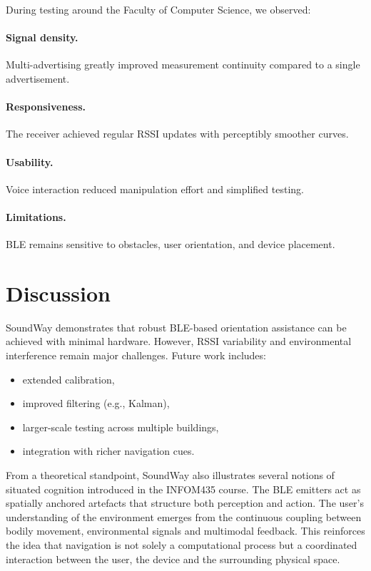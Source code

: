 \documentclass[sigconf]{acmart}
\begin{document}
During testing around the Faculty of Computer Science, we observed:

\paragraph{Signal density.}  
Multi-advertising greatly improved measurement continuity compared to a single advertisement.

\paragraph{Responsiveness.}  
The receiver achieved regular RSSI updates with perceptibly smoother curves.

\paragraph{Usability.}  
Voice interaction reduced manipulation effort and simplified testing.

\paragraph{Limitations.}  
BLE remains sensitive to obstacles, user orientation, and device placement.

\section{Discussion}

SoundWay demonstrates that robust BLE-based orientation assistance can be achieved with minimal hardware.  
However, RSSI variability and environmental interference remain major challenges.  
Future work includes:
\begin{itemize}
    \item extended calibration,
    \item improved filtering (e.g., Kalman),
    \item larger-scale testing across multiple buildings,
    \item integration with richer navigation cues.
\end{itemize}

From a theoretical standpoint, SoundWay also illustrates several notions of situated 
cognition introduced in the INFOM435 course. The BLE emitters act as spatially anchored 
artefacts that structure both perception and action. The user’s understanding of 
the environment emerges from the continuous coupling between bodily movement, 
environmental signals and multimodal feedback. This reinforces the idea that navigation 
is not solely a computational process but a coordinated interaction between the user, 
the device and the surrounding physical space.
\end{document}
